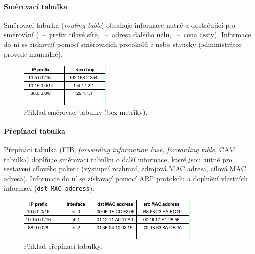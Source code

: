 \paragraph*{Směrovací tabulka} Směrovací tabulka (\textit{routing table}) obsahuje informace nutné a dostačující pro směrování (~--~prefix cílové sítě, ~--~adresa dalšího uzlu, ~--~cena cesty). Informace do ní se získavají pomocí směrovacích protokolů a nebo staticky (administrátor provede manuálně).

\begin{figure}[H]
    \centering
    \includegraphics[width=0.4\linewidth]{smerovaci_tabulka.pdf}
    \caption{Příklad směrovací tabulky (bez metriky).}
\end{figure}

\paragraph*{Přepínací tabulka} Přepínací tabulka (FIB, \textit{forwarding information base}, \textit{forwarding table}, CAM tabulka) doplňuje směrovací tabulku o další informace, které jsou nutné pro sestavení cílového paketu (výstupní rozhraní, zdrojová MAC adresa, cílová MAC adresa). Informace do ní se získavají pomocí ARP protokolu a doplnění vlastních informací (\texttt{dst MAC address}).

\begin{figure}[H]
    \centering
    \includegraphics[width=0.9\linewidth]{prepinaci_tabulka.pdf}
    \caption{Příklad přepínací tabulky.}
\end{figure}

